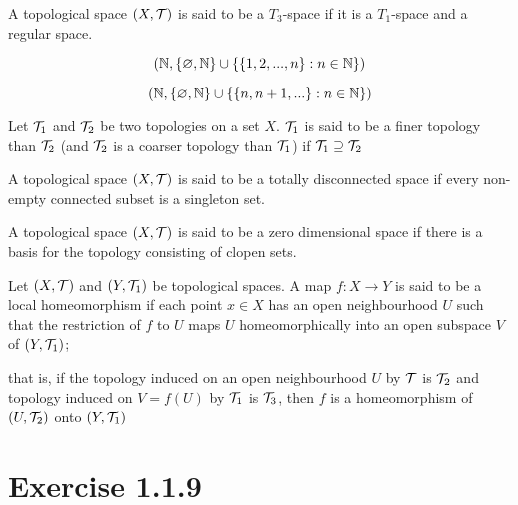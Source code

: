 \documentclass{article}
\begin{document}
\begin{definition}[$T_3$-space]
    A topological space $(X, \mathcal{T})$ is said to be a $T_3$-space if it is a $T_1$-space and a regular space.
\end{definition}

\begin{definition}
    $$
        (\mathbb{N}, \{\varnothing, \mathbb{N} \} \cup \{ \{1, 2, ..., n \}: n \in \mathbb{N}\})
    $$
\end{definition}

\begin{definition}
    $$
        (\mathbb{N}, \{\varnothing, \mathbb{N} \} \cup \{ \{n, n+1, ...\}: n \in \mathbb{N}\})
    $$
\end{definition}


\begin{definition}
Let $\mathcal{T}_1$ and $\mathcal{T}_2$ be two topologies on a set $X$. $\mathcal{T}_1$ is said to be a finer topology than $\mathcal{T}_2$ (and $\mathcal{T}_2$ is a coarser topology than $\mathcal{T}_1$) if $\mathcal{T}_1 \supseteq \mathcal{T}_2$
\end{definition}

\begin{definition}
    A topological space $(X, \mathcal{T})$ is said to be a totally disconnected space if every non-empty connected subset is a singleton set.
\end{definition}

\begin{definition}
    A topological space $(X, \mathcal{T})$ is said to be a zero dimensional space if there is a basis for the topology consisting of clopen sets.
\end{definition}

\begin{definition}
    Let $(X, \mathcal{T})$ and $(Y, \mathcal{T}_1)$ be topological spaces. A map $f: X \to Y$ is said to be a local homeomorphism if each point $x \in X$ has an open neighbourhood $U$ such that the restriction of $f$ to $U$ maps $U$ homeomorphically into an open subspace $V$ of $(Y, \mathcal{T}_1)$;
    
    that is, if the topology induced on an open neighbourhood $U$ by $\mathcal{T}$ is $\mathcal{T}_2$ and topology induced on $V = f(U)$ by $\mathcal{T}_1$ is $\mathcal{T}_3$, then $f$ is a homeomorphism of $(U, \mathcal{T}_2)$ onto $(Y, \mathcal{T}_1)$
\end{definition}


\section*{Exercise 1.1.9}
\end{document}

